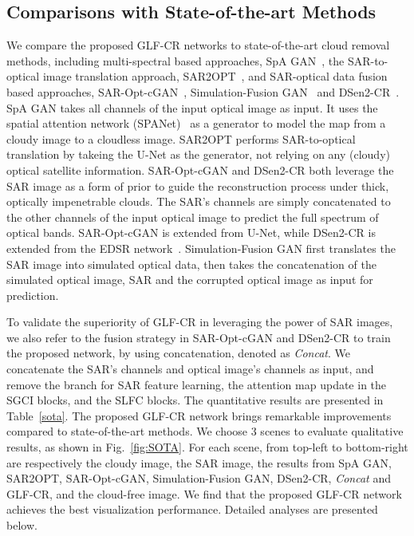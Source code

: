 \documentclass[a4paper,fleqn]{cas-dc}
\begin{document}
\subsection{Comparisons with State-of-the-art Methods}
We compare the proposed GLF-CR networks to state-of-the-art cloud removal methods, including multi-spectral based approaches, 
SpA GAN~\citep{pan2020cloud},  
the SAR-to-optical image translation approach, 
SAR2OPT~\citep{bermudez2018sar}, 
and SAR-optical data fusion based approaches,
SAR-Opt-cGAN~\citep{grohnfeldt2018conditional}, Simulation-Fusion GAN~\citep{gao2020cloud} and DSen2-CR~\citep{meraner2020cloud}.
SpA GAN takes all channels of the input optical image as input. It uses the spatial attention network (SPANet)~\citep{wang2019spatial} as a generator to model the map from a cloudy image to a cloudless image. 
SAR2OPT performs SAR-to-optical translation by takeing the U-Net as the generator, not relying on any (cloudy) optical satellite information.
SAR-Opt-cGAN and DSen2-CR both leverage the SAR image as a form of prior to guide the reconstruction process under thick, optically impenetrable clouds. The SAR's channels are simply concatenated to the other channels of the input optical image to predict the full spectrum of optical bands. SAR-Opt-cGAN is extended from U-Net, while DSen2-CR is extended from the EDSR network~\citep{lim2017enhanced}.
Simulation-Fusion GAN first translates the SAR image into simulated optical data, then takes the concatenation of the simulated optical image, SAR and the corrupted optical image as input for prediction.

To validate the superiority of GLF-CR in leveraging the power of SAR images, we also refer to the fusion strategy in SAR-Opt-cGAN and DSen2-CR to train the proposed network, by using concatenation, denoted as {\it Concat}. We concatenate the SAR's channels and optical image's channels as input, and remove the branch for SAR feature learning, the attention map update in the SGCI blocks, and the SLFC blocks. The quantitative results are presented in Table~\ref{sota}. The proposed GLF-CR network brings remarkable improvements compared to state-of-the-art methods. We choose 3 scenes to evaluate qualitative results, as shown in Fig.~\ref{fig:SOTA}. For each scene, from top-left to bottom-right are respectively the cloudy image, the SAR image, 
the results from SpA GAN,  SAR2OPT, SAR-Opt-cGAN, Simulation-Fusion GAN, DSen2-CR, {\it Concat} and GLF-CR, 
and the cloud-free image. We find that the proposed GLF-CR network achieves the best visualization performance. Detailed analyses are presented below.
\end{document}
